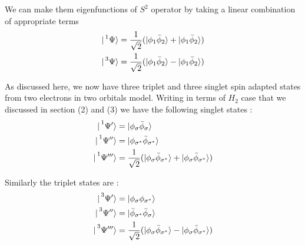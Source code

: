 \documentclass[11pt]{article}   	%
\begin{document}
	We can make them eigenfunctions of $S^2$ operator by taking a linear combination of appropriate terms
	\\
	\begin{equation}
	\begin{split}
		|\prescript{1}{}{\Psi}\rangle=\frac{1}{\sqrt{2}}(|\phi_1\bar{\phi}_2\rangle+|\phi_1\bar{\phi}_2\rangle)\\	
		|\prescript{3}{}{\Psi}\rangle=\frac{1}{\sqrt{2}}(|\phi_1\bar{\phi}_2\rangle-|\phi_1\bar{\phi}_2\rangle)\\
	\end{split}
	\end{equation}
	
	As discussed here, we now have three triplet and three singlet spin adapted states 
	from two electrons in two orbitals model. Writing in terms of $H_2$ case that we discussed in 
	section (2) and (3) we have the following singlet states :\\
	\begin{equation}
	\begin{split}
		|\prescript{1}{}{\Psi^{\prime}}\rangle&=|\phi_{\sigma}\bar{\phi}_{\sigma}\rangle\\
		|\prescript{1}{}{\Psi^{\prime \prime}}\rangle&=|\phi_{\sigma^*}\bar{\phi}_{\sigma^*}\rangle\\
		|\prescript{1}{}{\Psi^{\prime \prime \prime}}\rangle&=\frac{1}{\sqrt{2}}(|\phi_{\sigma}
		\bar{\phi}_{\sigma^*}\rangle+|\phi_{\sigma}\bar{\phi}_{\sigma^*}\rangle)\\	
	\end{split}
	\end{equation}
	
	Similarly the triplet states are :\\
	\begin{equation}
	\begin{split}
		|\prescript{3}{}{\Psi^{\prime}}\rangle&=|\phi_{\sigma}\phi_{\sigma^*}\rangle\\
		|\prescript{3}{}{\Psi^{\prime \prime}}\rangle&=|\bar{\phi}_{\sigma^*}\bar{\phi}_{\sigma}\rangle\\
		|\prescript{3}{}{\Psi^{\prime \prime \prime }}\rangle&=\frac{1}{\sqrt{2}}
		(|\phi_{\sigma}\bar{\phi}_{\sigma^*}\rangle-|\phi_{\sigma}\bar{\phi}_{\sigma^*}\rangle)\\
	\end{split}
	\end{equation}
\end{document}
